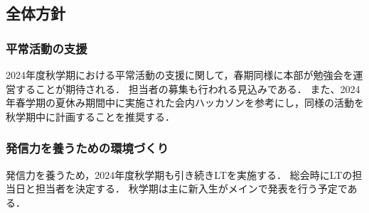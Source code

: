 \subsection*{全体方針}


\subsubsection*{平常活動の支援}
2024年度秋学期における平常活動の支援に関して，春期同様に本部が勉強会を運営することが期待される．
担当者の募集も行われる見込みである．
また、2024年春学期の夏休み期間中に実施された会内ハッカソンを参考にし，同様の活動を秋学期中に計画することを推奨する．

\subsubsection*{発信力を養うための環境づくり}
発信力を養うため，2024年度秋学期も引き続きLTを実施する．
総会時にLTの担当日と担当者を決定する．
秋学期は主に新入生がメインで発表を行う予定である．

